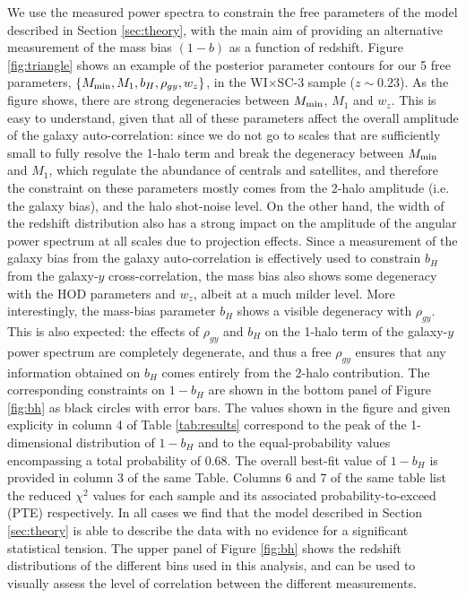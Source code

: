 \documentclass[useAMS,usenatbib]{mn2e}
\newcommand{\wisc}{WI$\times$SC}
\begin{document}
      We use the measured power spectra to constrain the free parameters of the model described in Section \ref{sec:theory}, with the main aim of providing an alternative measurement of the mass bias $(1-b)$ as a function of redshift. Figure \ref{fig:triangle} shows an example of the posterior parameter contours for our 5 free parameters, $\{M_{\rm min},M_1,b_H,\rho_{gy},w_z\}$, in the \wisc-3 sample ($z\sim0.23$). As the figure shows, there are strong degeneracies between $M_{\rm min}$, $M_1$ and $w_z$. This is easy to understand, given that all of these parameters affect the overall amplitude of the galaxy auto-correlation: since we do not go to scales that are sufficiently small to fully resolve the 1-halo term and break the degeneracy between $M_{\rm min}$ and $M_1$, which regulate the abundance of centrals and satellites, and therefore the constraint on these parameters mostly comes from the 2-halo amplitude (i.e. the galaxy bias), and the halo shot-noise level. On the other hand, the width of the redshift distribution also has a strong impact on the amplitude of the angular power spectrum at all scales due to projection effects. Since a measurement of the galaxy bias from the galaxy auto-correlation is effectively used to constrain $b_H$ from the galaxy-$y$ cross-correlation, the mass bias also shows some degeneracy with the HOD parameters and $w_z$, albeit at a much milder level. More interestingly, the mass-bias parameter $b_H$ shows a visible degeneracy with $\rho_{gy}$. This is also expected: the effects of $\rho_{gy}$ and $b_H$ on the 1-halo term of the galaxy-$y$ power spectrum are completely degenerate, and thus a free $\rho_{gy}$ ensures that any information obtained on $b_H$ comes entirely from the 2-halo contribution. The corresponding constraints on $1-b_H$ are shown in the bottom panel of Figure \ref{fig:bh} as black circles with error bars. The values shown in the figure and given explicity in column 4 of Table \ref{tab:results} correspond to the peak of the 1-dimensional distribution of $1-b_H$ and to the equal-probability values encompassing a total probability of 0.68. The overall best-fit value of $1-b_H$ is provided in column 3 of the same Table. Columns 6 and 7 of the same table list the reduced $\chi^2$ values for each sample and its associated probability-to-exceed (PTE) respectively. In all cases we find that the model described in Section \ref{sec:theory} is able to describe the data with no evidence for a significant statistical tension. The upper panel of Figure \ref{fig:bh} shows the redshift distributions of the different bins used in this analysis, and can be used to visually assess the level of correlation between the different measurements.
\end{document}
